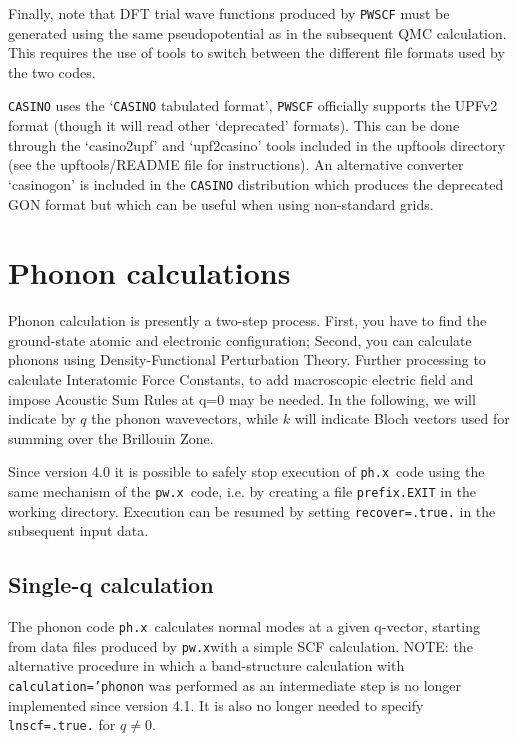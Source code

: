 \documentclass[12pt,a4paper]{article}
\def\pwx{\texttt{pw.x}}
\def\phx{\texttt{ph.x}}
\begin{document}
Finally, note that DFT trial wave functions produced by \texttt{PWSCF}
must be generated using the same pseudopotential as in the subsequent QMC 
calculation. This requires the use of tools to switch between the different 
file formats used by the two codes.

\texttt{CASINO} uses the `\texttt{CASINO} tabulated format', \texttt{PWSCF} officially supports 
the UPFv2 format (though it will read other `deprecated' formats).
This can be done through the `casino2upf' and `upf2casino' tools included in the upftools directory (see the upftools/README file for instructions). An alternative converter `casinogon' is included in the \texttt{CASINO} distribution which produces the deprecated GON format but which can be useful when using non-standard grids.

\section{Phonon calculations}

Phonon calculation is presently a two-step process.
First, you have to find the ground-state atomic and electronic configuration;
Second, you can calculate phonons using Density-Functional Perturbation Theory.
Further processing to calculate Interatomic Force Constants, to add macroscopic
electric field and impose Acoustic Sum Rules at q=0 may be needed.
In the following, we will indicate by $q$ the phonon wavevectors, 
while $k$ will indicate Bloch vectors used for summing over the Brillouin Zone.

Since version 4.0 it is possible to safely stop execution of 
\phx\ code using
the same mechanism of the \pwx\ code, i.e. by creating a file \texttt{prefix.EXIT} in the 
working directory. Execution can be resumed by setting \texttt{recover=.true.} 
in the subsequent input data.

\subsection{Single-q calculation}

The phonon code \phx\ calculates normal modes at a given q-vector, starting
from data files produced by \pwx with a simple SCF calculation.
NOTE: the alternative procedure in which a band-structure calculation 
with \texttt{calculation='phonon} was performed as an intermediate step is no
longer implemented since version 4.1. It is also no longer needed to
specify \texttt{lnscf=.true.} for $q\ne 0$.
\end{document}
